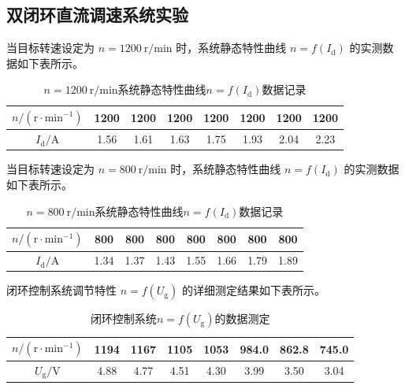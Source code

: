 \begin{framed}
{			\subsection{双闭环直流调速系统实验}
			
			当目标转速设定为 $n=1200\ \text{r/min}$ 时，系统静态特性曲线 $n=f(I_\text{d})$ 的实测数据如下表所示。
			\begin{table}[H]
				\centering
				\caption{\hspace{0.5em}$n=1200\ \text{r/min}$系统静态特性曲线$n=f(I_\text{d})$数据记录}
				\begin{tabular}{cccccccc}
					\toprule
					$n/(\text{r}\cdot\text{min}^{-1})$ & 1200 & 1200 & 1200 & 1200 & 1200 & 1200 & 1200 \\
					\hline
					$I_\text{d}/\text{A}$ & 1.56 & 1.61 & 1.63 & 1.75 & 1.93 & 2.04 & 2.23 \\
					\bottomrule
				\end{tabular}
			\end{table}
			
			当目标转速设定为 $n=800\ \text{r/min}$ 时，系统静态特性曲线 $n=f(I_\text{d})$ 的实测数据如下表所示。
			\begin{table}[H]
				\centering
				\caption{\hspace{0.5em}$n=800\ \text{r/min}$系统静态特性曲线$n=f(I_\text{d})$数据记录}
				\begin{tabular}{cccccccc}
					\toprule
					$n/(\text{r}\cdot\text{min}^{-1})$ & 800 & 800 & 800 & 800 & 800 & 800 & 800 \\
					\hline
					$I_\text{d}/\text{A}$ & 1.34 & 1.37 & 1.43 & 1.55 & 1.66 & 1.79 & 1.89 \\
					\bottomrule
				\end{tabular}
			\end{table}
			
			闭环控制系统调节特性 $n=f(U_\text{g})$ 的详细测定结果如下表所示。
			\begin{table}[H]
				\centering
				\caption{\hspace{0.5em}闭环控制系统$n=f(U_\text{g})$的数据测定}
				\begin{tabular}{cccccccc}
					\toprule
					$n/(\text{r}\cdot\text{min}^{-1})$ & 1194 & 1167 & 1105 & 1053 & 984.0 & 862.8 & 745.0 \\
					\hline
					$U_\text{g}/\text{V}$ & 4.88 & 4.77 & 4.51 & 4.30 & 3.99 &3.50 & 3.04 \\
					\bottomrule
				\end{tabular}
			\end{table}
			
}
\end{framed}

